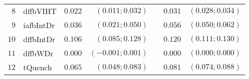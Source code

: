 \begin{table*}[!ht]
\begin{tabular*}{\textwidth}{@{}rlrrrrr@{}}
\footnotesize{$8 $} & \footnotesize{dffbVIHT } & \footnotesize{$0.022$}   & \footnotesize{$(0.011;0.032)$}  && \footnotesize{$0.031$} & \footnotesize{$(0.028;0.034)$} \\
\footnotesize{$9 $} & \footnotesize{iafbIntDr} & \footnotesize{$0.036$}   & \footnotesize{$(0.021;0.050)$}  && \footnotesize{$0.056$} & \footnotesize{$(0.050;0.062)$} \\
\footnotesize{$10$} & \footnotesize{dffbIntDr} & \footnotesize{$0.106$}   & \footnotesize{$(0.085;0.128)$}  && \footnotesize{$0.120$} & \footnotesize{$(0.111;0.130)$} \\
\footnotesize{$11$} & \footnotesize{dffbWDr  } & \footnotesize{$0.000$}  & \footnotesize{$(-0.001;0.001)$}  && \footnotesize{$0.000$} & \footnotesize{$(0.000;0.000)$} \\
\footnotesize{$12$} & \footnotesize{tQuench  } & \footnotesize{$0.065$}   & \footnotesize{$(0.048;0.083)$}  && \footnotesize{$0.081$} & \footnotesize{$(0.074;0.088)$} \\

\bottomrule
\end{tabular*}
\end{table*}

